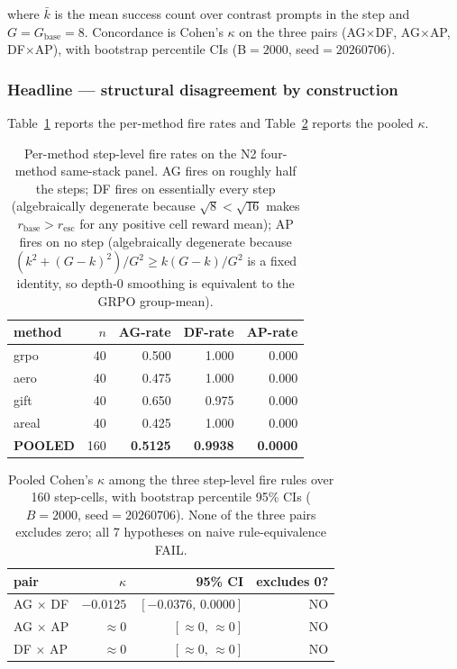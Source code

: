 \documentclass{article}
\begin{document}
\noindent where $\bar{k}$ is the mean success count over contrast
prompts in the step and $G = G_{\mathrm{base}} = 8$.  Concordance is
Cohen's $\kappa$ on the three pairs (AG$\times$DF, AG$\times$AP,
DF$\times$AP), with bootstrap percentile CIs (B$=2000$,
seed$=20260706$).

\subsubsection*{Headline --- structural disagreement by construction}

Table~\ref{tab:p7-iter195-rates} reports the per-method fire rates
and Table~\ref{tab:p7-iter195-kappa} reports the pooled $\kappa$.

\begin{table}[t]
\centering
\small
\begin{tabular}{lrrrr}
\toprule
method & $n$ & AG-rate & DF-rate & AP-rate \\
\midrule
grpo  & 40 & 0.500 & 1.000 & 0.000 \\
aero  & 40 & 0.475 & 1.000 & 0.000 \\
gift  & 40 & 0.650 & 0.975 & 0.000 \\
areal & 40 & 0.425 & 1.000 & 0.000 \\
\midrule
\textbf{POOLED} & 160 & \textbf{0.5125} & \textbf{0.9938} & \textbf{0.0000} \\
\bottomrule
\end{tabular}
\caption{Per-method step-level fire rates on the N2 four-method same-stack panel.  AG fires on roughly half the steps; DF fires on essentially every step (algebraically degenerate because $\sqrt{8} < \sqrt{16}$ makes $r_{\mathrm{base}} > r_{\mathrm{esc}}$ for any positive cell reward mean); AP fires on no step (algebraically degenerate because $(k^2 + (G-k)^2)/G^2 \ge k(G-k)/G^2$ is a fixed identity, so depth-0 smoothing is equivalent to the GRPO group-mean).}
\label{tab:p7-iter195-rates}
\end{table}

\begin{table}[t]
\centering
\small
\begin{tabular}{lrrr}
\toprule
pair & $\kappa$ & 95\% CI & excludes 0? \\
\midrule
AG $\times$ DF & $-0.0125$ & $[-0.0376,\, 0.0000]$ & NO \\
AG $\times$ AP & $\approx 0$ & $[\approx 0,\, \approx 0]$ & NO \\
DF $\times$ AP & $\approx 0$ & $[\approx 0,\, \approx 0]$ & NO \\
\bottomrule
\end{tabular}
\caption{Pooled Cohen's $\kappa$ among the three step-level fire rules over 160 step-cells, with bootstrap percentile 95\% CIs ($B{=}2000$, seed$=20260706$).  None of the three pairs excludes zero; all 7 hypotheses on naive rule-equivalence FAIL.}
\label{tab:p7-iter195-kappa}
\end{table}
\end{document}
